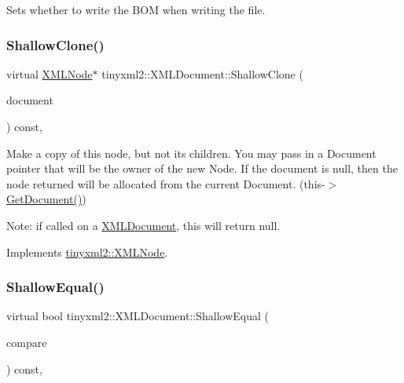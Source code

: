 Sets whether to write the B\+OM when writing the file. \mbox{\label{classtinyxml2_1_1_x_m_l_document_aa37cc1709d7e1e988bc17dcfb24a69b8}} 
\subsubsection{\texorpdfstring{Shallow\+Clone()}{ShallowClone()}}
{\footnotesize\ttfamily virtual \mbox{\hyperlink{classtinyxml2_1_1_x_m_l_node}{X\+M\+L\+Node}}$\ast$ tinyxml2\+::\+X\+M\+L\+Document\+::\+Shallow\+Clone (\begin{DoxyParamCaption}\item[{\mbox{\hyperlink{classtinyxml2_1_1_x_m_l_document}{X\+M\+L\+Document}} $\ast$}]{document }\end{DoxyParamCaption}) const\hspace{0.3cm}{\ttfamily [inline]}, {\ttfamily [virtual]}}

Make a copy of this node, but not its children. You may pass in a Document pointer that will be the owner of the new Node. If the \textquotesingle{}document\textquotesingle{} is null, then the node returned will be allocated from the current Document. (this-\/$>$\mbox{\hyperlink{classtinyxml2_1_1_x_m_l_node_af343d1ef0b45c0020e62d784d7e67a68}{Get\+Document()}})

Note\+: if called on a \mbox{\hyperlink{classtinyxml2_1_1_x_m_l_document}{X\+M\+L\+Document}}, this will return null. 

Implements \mbox{\hyperlink{classtinyxml2_1_1_x_m_l_node_a8402cbd3129d20e9e6024bbcc0531283}{tinyxml2\+::\+X\+M\+L\+Node}}.

\mbox{\label{classtinyxml2_1_1_x_m_l_document_a6fe5ef18699091844fcf64b56ffa5bf9}} 
\subsubsection{\texorpdfstring{Shallow\+Equal()}{ShallowEqual()}}
{\footnotesize\ttfamily virtual bool tinyxml2\+::\+X\+M\+L\+Document\+::\+Shallow\+Equal (\begin{DoxyParamCaption}\item[{const \mbox{\hyperlink{classtinyxml2_1_1_x_m_l_node}{X\+M\+L\+Node}} $\ast$}]{compare }\end{DoxyParamCaption}) const\hspace{0.3cm}{\ttfamily [inline]}, {\ttfamily [virtual]}}


